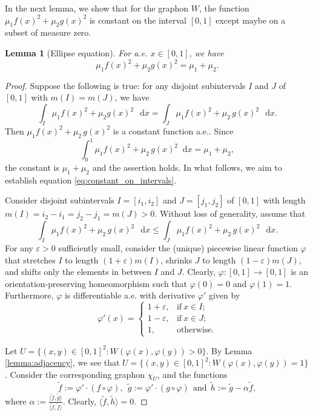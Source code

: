 \documentclass[11pt]{article}
\theoremstyle{plain}
\newtheorem{lemma}[theorem]{Lemma}
\theoremstyle{definition}
\numberwithin{equation}{section}
\newcommand{\dif}{\mathop{}\!\mathrm{d}}
\begin{document}
In the next lemma, we show that for the graphon $W$, the function $\mu_1 f(x)^2 + \mu_2 g(x)^2$ 
is constant on the interval $[0,1]$ except maybe on a subset of measure zero.

\begin{lemma}[Ellipse equation]\label{lemma:ellipse}
For a.e. $x\in [0,1]$, we have    
\[
\mu_1 f(x)^2 + \mu_2 g(x)^2 = \mu_1 + \mu_2. 
\]
\end{lemma}

\begin{proof} 
Suppose the following is true: for any disjoint subintervals $I$ 
and $J$ of $[0,1]$ with $m(I)=m(J)$, we have 
\begin{equation}\label{eq:constant_on_intervals}
\int_I \mu_1 f(x)^2 + \mu_2 g(x)^2 \, \dif{x} = \int_J \mu_1 f(x)^2 + \mu_2\, g(x)^2 \,\dif{x}.
\end{equation}
Then $\mu_1 f(x)^2 + \mu_2\,g(x)^2$ is a constant function a.e.. Since 
\[
\int_0^1\mu_1 f(x)^2 + \mu_2\,g(x)^2 \dif{x} = \mu_1 +\mu_2,
\] 
the constant is $\mu_1 +\mu_2$ and the assertion holds. In what follows, 
we aim to establish equation \eqref{eq:constant_on_intervals}. 

Consider disjoint subintervals $I=[i_1, i_2]$ and $J=[j_1, j_2]$ of $[0,1]$ 
with length $m(I)=i_2-i_1=j_2- j_1=m(J)>0$. Without loss of generality, assume that
\[  
\int_I \mu_1 f(x)^2 + \mu_2\,g(x)^2 \, \dif{x} \leq \int_J \mu_1 f(x)^2 + \mu_2\, g(x)^2 \,\dif{x}.
\]
For any $\varepsilon > 0$ sufficiently small, consider the (unique) piecewise linear 
function $\varphi$ that stretches $I$ to length $(1 + \varepsilon) m(I)$, shrinks $J$ 
to length $(1 - \varepsilon) m(J)$, and shifts only the elements in between $I$ and $J$. 
Clearly, $\varphi: [0, 1] \to [0, 1]$ is an orientation-preserving homeomorphism such 
that $\varphi(0) =0$ and $\varphi(1)=1$. Furthermore, $\varphi$ is differentiable a.e. 
with derivative $\varphi'$ given by
\[
\varphi'(x) = 
\begin{cases}
1 + \varepsilon, & \text{if}\ x\in I; \\
1 - \varepsilon, & \text{if}\ x\in J; \\
1, & \text{otherwise}.
\end{cases}
\]

Let $U = \{(x,y)\in [0,1]^2: W(\varphi(x), \varphi(y)) > 0\}$. 
By Lemma \ref{lemma:adjacency}, we see that $U = \{(x,y)\in [0,1]^2: W(\varphi(x), \varphi(y)) = 1\}$.  
Consider the corresponding graphon $\chi_U$, and the functions 
\begin{equation}\label{eq:tilde-f-g-h}
\tilde{f}:= \varphi'\cdot (f \circ \varphi), ~~ 
\tilde{g}:= \varphi'\cdot (g \circ \varphi) ~~\text{and}~~ \tilde{h}:=\tilde{g} - \alpha \tilde{f},
\end{equation}
where $\alpha := \frac{\langle \tilde{f}, \tilde{g}\rangle}{\langle \tilde{f}, \tilde{f}\rangle}$. 
Clearly, $\langle \tilde{f}, \tilde{h}\rangle = 0$. 


\end{proof}
\end{document}
